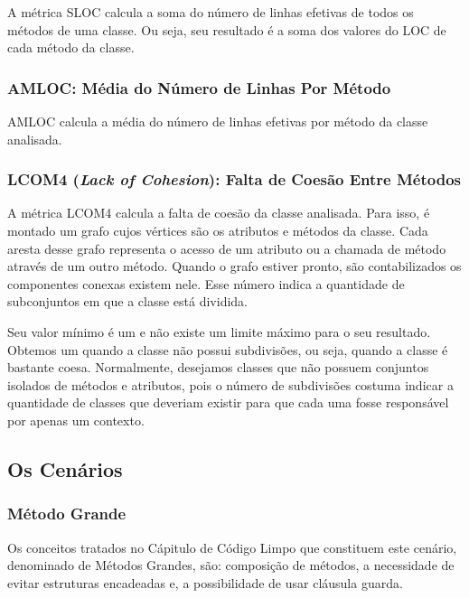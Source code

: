 A métrica SLOC calcula a soma do número de linhas efetivas de todos os métodos de uma classe. Ou seja, seu resultado é a soma dos valores do LOC de cada método da classe.


\subsubsection{AMLOC: Média do Número de Linhas Por Método}
                                   
AMLOC calcula a média do número de linhas efetivas por método da classe analisada.
	

\subsubsection{LCOM4 (\textit{Lack of Cohesion}): Falta de Coesão Entre Métodos}

A métrica LCOM4 \citep{HM96} calcula a falta de coesão da classe analisada. Para isso, é montado um grafo cujos vértices são os atributos e métodos da classe. Cada aresta desse grafo representa o acesso de um atributo ou a chamada de método através de um outro método. Quando o grafo estiver pronto, são contabilizados os componentes conexas existem nele. Esse número indica a quantidade de subconjuntos em que a classe está dividida.

Seu valor mínimo é um e não existe um limite máximo para o seu resultado. Obtemos um quando a classe não possui subdivisões, ou seja, quando a classe é bastante coesa. Normalmente, desejamos classes que não possuem conjuntos isolados de métodos e atributos, pois o número de subdivisões costuma indicar a quantidade de classes que deveriam existir para que cada uma fosse responsável por apenas um contexto.
                                                    
	  

\subsection{Os Cenários}

\subsubsection{Método Grande}

Os conceitos tratados no Cápitulo de Código Limpo que constituem este cenário, denominado de Métodos Grandes, são: composição de métodos, a necessidade de evitar estruturas encadeadas e, a possibilidade de usar cláusula guarda.
	
